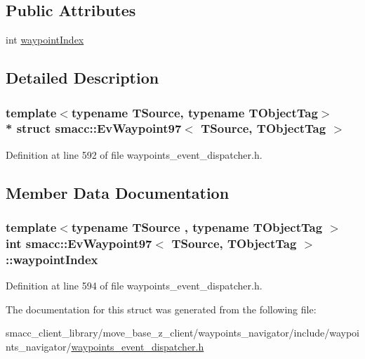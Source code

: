 \subsection*{Public Attributes}
\begin{DoxyCompactItemize}
\item 
int \hyperlink{structsmacc_1_1EvWaypoint97_aa69b9b1c362438ae90a6b76c49e8a436}{waypoint\+Index}
\end{DoxyCompactItemize}


\subsection{Detailed Description}
\subsubsection*{template$<$typename T\+Source, typename T\+Object\+Tag$>$\\*
struct smacc\+::\+Ev\+Waypoint97$<$ T\+Source, T\+Object\+Tag $>$}



Definition at line 592 of file waypoints\+\_\+event\+\_\+dispatcher.\+h.



\subsection{Member Data Documentation}
\subsubsection[{\texorpdfstring{waypoint\+Index}{waypointIndex}}]{\setlength{\rightskip}{0pt plus 5cm}template$<$typename T\+Source , typename T\+Object\+Tag $>$ int {\bf smacc\+::\+Ev\+Waypoint97}$<$ T\+Source, T\+Object\+Tag $>$\+::waypoint\+Index}\hypertarget{structsmacc_1_1EvWaypoint97_aa69b9b1c362438ae90a6b76c49e8a436}{}\label{structsmacc_1_1EvWaypoint97_aa69b9b1c362438ae90a6b76c49e8a436}


Definition at line 594 of file waypoints\+\_\+event\+\_\+dispatcher.\+h.



The documentation for this struct was generated from the following file\+:\begin{DoxyCompactItemize}
\item 
smacc\+\_\+client\+\_\+library/move\+\_\+base\+\_\+z\+\_\+client/waypoints\+\_\+navigator/include/waypoints\+\_\+navigator/\hyperlink{waypoints__event__dispatcher_8h}{waypoints\+\_\+event\+\_\+dispatcher.\+h}\end{DoxyCompactItemize}
